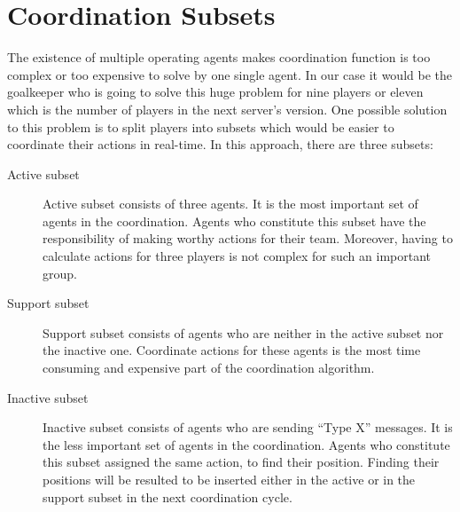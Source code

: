 \section{Coordination Subsets}
The existence of multiple operating agents makes coordination function is too complex or too expensive to solve by one single agent. In our case it would be the goalkeeper who is going to solve this huge problem for nine players or eleven which is the number of players in the next server's version. One possible solution to this problem is to split players into subsets which would be easier to coordinate their actions in real-time. In this approach, there are three subsets:
\begin{description}
\item[Active subset] Active subset consists of three agents. It is the most important set of agents in the coordination. Agents who constitute this subset have the responsibility of making worthy actions for their team. Moreover, having to calculate actions for three players is not complex for such an important group. 

\item[Support subset] Support subset consists of agents who are neither in the active subset nor the inactive one. Coordinate actions for these agents is the most time consuming and expensive part of the coordination algorithm.

\item[Inactive subset]Inactive subset consists of agents who are sending ``Type X'' messages. It is the less important set of agents in the coordination. Agents who constitute this subset assigned the same action, to find their position. Finding their positions will be resulted to be inserted either in the active or in the support subset in the next coordination cycle.
\end{description}


